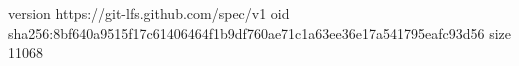 version https://git-lfs.github.com/spec/v1
oid sha256:8bf640a9515f17c61406464f1b9df760ae71c1a63ee36e17a541795eafc93d56
size 11068
